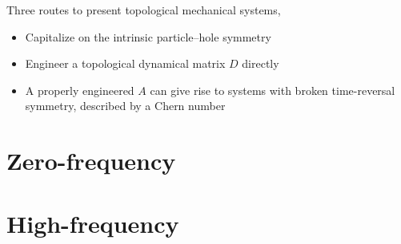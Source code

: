 \documentclass[aps,pre,preprint,groupedaddress]{revtex4-1}
\begin{document}
Three routes to present topological mechanical systems,
\begin{itemize}
\item Capitalize on the intrinsic particle–hole symmetry
\item Engineer a topological dynamical matrix $D$ directly
\item A properly engineered $A$ can give rise to systems with broken time-reversal symmetry, described by a Chern number
\end{itemize}

\section{Zero-frequency}

\section{High-frequency}


%

\end{document}
